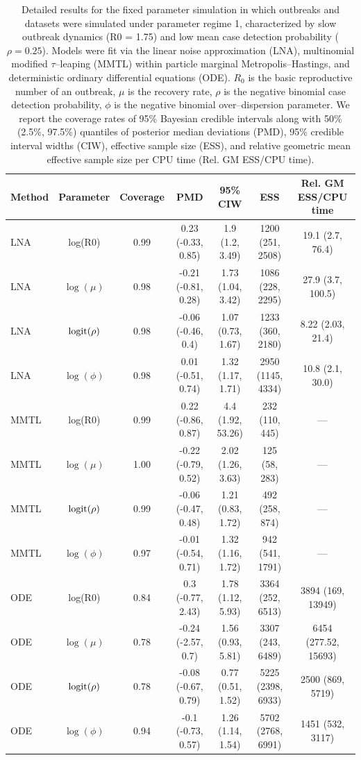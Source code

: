 \begin{table}
		\footnotesize
		\centering
		\begin{tabular}{lcccccc}
			\hline
			\textbf{Method} & \textbf{Parameter} & \textbf{Coverage} & \textbf{PMD} & \textbf{95\% CIW} & \textbf{ESS} & \textbf{Rel. GM ESS/CPU time} \\ 
			\hline
			LNA & log(R0) & 0.99 & 0.23 (-0.33, 0.85) & 1.9 (1.2, 3.49) & 1200 (251, 2508) & 19.1 (2.7, 76.4) \\ 
			LNA & $\log(\mu)$ & 0.98 & -0.21 (-0.81, 0.28) & 1.73 (1.04, 3.42) & 1086 (228, 2295) & 27.9 (3.7, 100.5) \\ 
			LNA & $\mathrm{logit}(\rho)$ & 0.98 & -0.06 (-0.46, 0.4) & 1.07 (0.73, 1.67) & 1233 (360, 2180) & 8.22 (2.03, 21.4) \\ 
			LNA & $\log(\phi)$ & 0.98 & 0.01 (-0.51, 0.74) & 1.32 (1.17, 1.71) & 2950 (1145, 4334) & 10.8 (2.1, 30.0) \\ 
			MMTL & log(R0) & 0.99 & 0.22 (-0.86, 0.87) & 4.4 (1.92, 53.26) & 232 (110, 445) & --- \\ 
			MMTL & $\log(\mu)$ & 1.00 & -0.22 (-0.79, 0.52) & 2.02 (1.26, 3.63) & 125 (58, 283) & --- \\ 
			MMTL & $\mathrm{logit}(\rho)$ & 0.99 & -0.06 (-0.47, 0.48) & 1.21 (0.83, 1.72) & 492 (258, 874) & --- \\ 
			MMTL & $\log(\phi)$ & 0.97 & -0.01 (-0.54, 0.71) & 1.32 (1.16, 1.72) & 942 (541, 1791) & --- \\ 
			ODE & log(R0) & 0.84 & 0.3 (-0.77, 2.43) & 1.78 (1.12, 5.93) & 3364 (252, 6513) & 3894 (169, 13949) \\ 
			ODE & $\log(\mu)$ & 0.78 & -0.24 (-2.57, 0.7) & 1.56 (0.93, 5.81) & 3307 (243, 6489) & 6454 (277.52, 15693) \\ 
			ODE & $\mathrm{logit}(\rho)$ & 0.78 & -0.08 (-0.67, 0.79) & 0.77 (0.51, 1.52) & 5225 (2398, 6933) & 2500 (869, 5719) \\ 
			ODE & $\log(\phi)$ & 0.94 & -0.1 (-0.73, 0.57) & 1.26 (1.14, 1.54) & 5702 (2768, 6991) & 1451 (532, 3117) \\ 
			\hline
		\end{tabular}
		\caption[Slow dynamics, low detection probability regime fixed parameter coverage simulation results.]{Detailed results for the fixed parameter  simulation in which outbreaks and datasets were simulated under parameter regime 1, characterized by slow outbreak dynamics (R0 = 1.75) and low mean case detection probability ($ \rho=0.25 $). Models were fit via the linear noise approximation (LNA), multinomial modified $ \tau $--leaping (MMTL) within particle marginal Metropolis--Hastings, and deterministic ordinary differential equations (ODE). $ R_0 $ is the basic reproductive number of an outbreak, $ \mu $ is the recovery rate, $ \rho $ is the negative binomial case detection probability, $ \phi $ is the negative binomial over--dispersion parameter. We report the coverage rates of 95\% Bayesian credible intervals along with 50\% (2.5\%, 97.5\%) quantiles of posterior median deviations (PMD), 95\% credible interval widths (CIW), effective sample size (ESS), and relative geometric mean effective sample size per CPU time (Rel. GM ESS/CPU time).}
\end{table}

